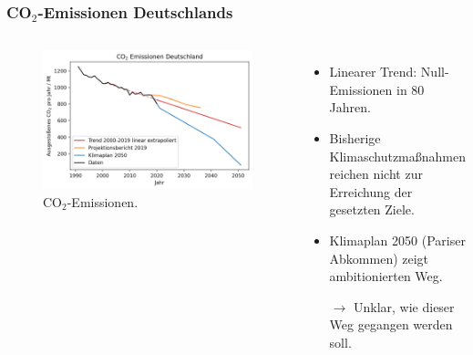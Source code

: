 \begin{frame}
  \frametitle{CO$_2$-Emissionen Deutschlands}
  \begin{columns}
      \begin{figure}
		    \centering
		    \includegraphics[width=\linewidth]{bilder/co2-emissions-de.png}
		    \caption{CO$_2$-Emissionen.}
      \end{figure}
      \begin{itemize}
        \item Linearer Trend: Null-Emissionen in 80 Jahren.
        \item Bisherige Klimaschutzmaßnahmen reichen nicht zur Erreichung der gesetzten Ziele.
        \item Klimaplan 2050 (Pariser Abkommen) zeigt ambitionierten Weg.
        \item[$\rightarrow$] Unklar, wie dieser Weg gegangen werden soll.
      \end{itemize}
    \end{columns}
\end{frame}

